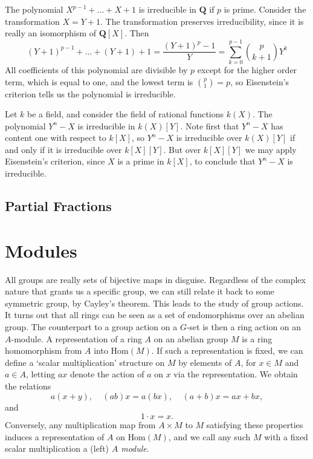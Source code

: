 \begin{example}
    The polynomial $X^{p-1} + \dots + X + 1$ is irreducible in $\mathbf{Q}$ if $p$ is prime. Consider the transformation $X = Y + 1$. The transformation preserves irreducibility, since it is really an isomorphism of $\mathbf{Q}[X]$. Then
    \[ (Y + 1)^{p-1} + \dots + (Y + 1) + 1 = \frac{(Y + 1)^p - 1}{Y} = \sum_{k = 0}^{p-1} \binom{p}{k+1} Y^k \]
    All coefficients of this polynomial are divisible by $p$ except for the higher order term, which is equal to one, and the lowest term is $\binom{p}{1} = p$, so Eisenstein's criterion tells us the polynomial is irreducible.
\end{example}

\begin{example}
    Let $k$ be a field, and consider the field of rational functions $k(X)$. The polynomial $Y^n - X$ is irreducible in $k(X)[Y]$. Note first that $Y^n - X$ has content one with respect to $k[X]$, so $Y^n - X$ is irreducible over $k(X)[Y]$ if and only if it is irreducible over $k[X][Y]$. But over $k[X][Y]$ we may apply Eisenstein's criterion, since $X$ is a prime in $k[X]$, to conclude that $Y^n - X$ is irreducible.
\end{example}


\section{Partial Fractions}













\chapter{Modules}

All groups are really sets of bijective maps in disguise. Regardless of the complex nature that grants us a specific group, we can still relate it back to some symmetric group, by Cayley's theorem. This leads to the study of group actions. It turns out that all rings can be seen as a set of endomorphisms over an abelian group. The counterpart to a group action on a $G$-set is then a ring action on an $A$-module. A representation of a ring $A$ on an abelian group $M$ is a ring homomorphism from $A$ into $\text{Hom}(M)$. If such a representation is fixed, we can define a `scalar multiplication' structure on $M$ by elements of $A$, for $x \in M$ and $a \in A$, letting $ax$ denote the action of $a$ on $x$ via the representation. We obtain the relations
%
\[ a(x + y),\ \ \ \ \ (ab) x = a(bx),\ \ \ \ \ (a + b)x = ax + bx, \]
%
and
%
\[ 1 \cdot x = x. \]
%
Conversely, any multiplication map from $A \times M$ to $M$ satisfying these properties induces a representation of $A$ on $\text{Hom}(M)$, and we call any such $M$ with a fixed scalar multiplication a (left) \emph{$A$ module}.

